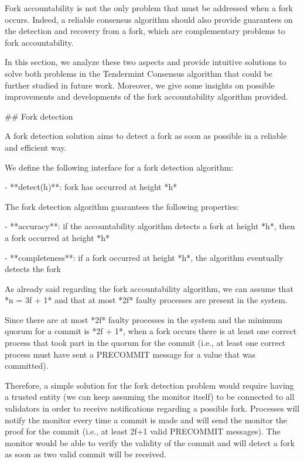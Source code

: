 \documentclass[a4paper,11pt,oneside]{report}
\begin{document}
\begin{markdown}

Fork accountability is not the only problem that must be addressed when a fork occurs. Indeed, a reliable consensus algorithm should also provide guarantees on the detection and recovery from a fork, which are complementary problems to fork accountability. 

In this section, we analyze these two aspects and provide intuitive solutions to solve both problems in the Tendermint Consensus algorithm that could be further studied in future work. Moreover, we give some insights on possible improvements and developments of the fork accountability algorithm provided.

## Fork detection

A fork detection solution aims to detect a fork as soon as possible in a reliable and efficient way.

We define the following interface for a fork detection algorithm:

- **detect(h)**: fork has occurred at height *h*

The fork detection algorithm guarantees the following properties:

- **accuracy**: if the accountability algorithm detects a fork at height *h*, then a fork occurred at height *h*

- **completeness**: if a fork occurred at height *h*, the algorithm eventually detects the fork

As already said regarding the fork accountability algorithm, we can assume that *n = 3f + 1* and that at most *2f* faulty processes are present in the system.

Since there are at most *2f* faulty processes in the system and the minimum quorum for a commit is *2f + 1*, when a fork occurs there is at least one correct process that took part in the quorum for the commit (i.e., at least one correct process must have sent a PRECOMMIT message for a value that was committed).

Therefore, a simple solution for the fork detection problem would require having a trusted entity (we can keep assuming the monitor itself) to be connected to all validators in order to receive notifications regarding a possible fork.
Processes will notify the monitor every time a commit is made and will send the monitor the proof for the commit (i.e., at least 2f+1 valid PRECOMMIT messages). The monitor would be able to verify the validity of the commit and will detect a fork as soon as two valid commit will be received.


\end{markdown}
\end{document}
